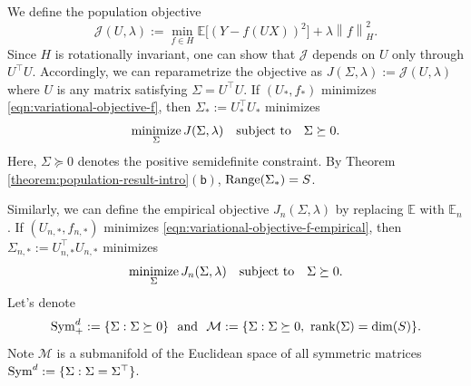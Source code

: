 \documentclass[sn-mathphys-num]{sn-jnl}%
\numberwithin{equation}{section}
\newcommand{\R}{\mathbb{R}}
\newcommand{\E}{\mathbb{E}}
\newcommand{\norm}[1]{\left\|{#1}\right\|} %
\providecommand{\minimize}{\mathop{\rm minimize}}
\newcommand{\matrixnorm}[1]{\left|\!\left|\!\left|{#1}
  \right|\!\right|\!\right|} %
\newcommand{\Range}{{\rm Range}}
\newcommand{\rank}{{\rm rank}}
\newcommand{\Sym}{{\rm \mathrm{Sym}}}
\providecommand{\minimize}{\mathop{\rm minimize}}
\theoremstyle{thmstyleone}%
\theoremstyle{thmstyletwo}%
\theoremstyle{thmstylethree}%
\begin{document}
We define the population objective 
\begin{equation}
\label{eqn:definition-of-J}
	\mathcal{J}(U, \lambda) := \min_{f \in H}
		\E \big[(Y - f(UX))^2\big] + \lambda \norm{f}_{H}^2 .
\end{equation}
Since $H$ is rotationally invariant, one can show that $\mathcal{J}$ depends on $U$ only through $U^\top U$.
Accordingly, we can reparametrize the objective as
$J(\Sigma,\lambda) := \mathcal{J}(U,\lambda)$
where $U$ is any matrix satisfying $\Sigma = U^\top U$. 
If $(U_{*}, f_{*})$ minimizes \eqref{eqn:variational-objective-f}, then
$\Sigma_{*} := U_{*}^\top U_{*}$ minimizes
\begin{equation}
	\minimize_\Sigma J(\Sigma, \lambda)~~~\text{subject to}~~~\Sigma \succeq 0. 
\end{equation}
Here, $\Sigma \succeq 0$ denotes the positive semidefinite constraint. By Theorem
\ref{theorem:population-result-intro}$\mathsf{(b)}$, $\Range(\Sigma_*) = S$.

Similarly, we can define the empirical objective $J_n(\Sigma,\lambda)$ by replacing $\E$ with $\E_n$.
If $(U_{n, *}, f_{n, *})$ minimizes \eqref{eqn:variational-objective-f-empirical}, then
$\Sigma_{n, *} := U_{n, *}^\top U_{n, *}$ minimizes
\begin{equation}
	\minimize_\Sigma J_n(\Sigma, \lambda)~~~\text{subject to}~~~\Sigma \succeq 0.
\end{equation} 
Let's denote 
\begin{equation}
\label{eqn:definition-of-sym-+-d-M}
	\Sym_+^d := \{\Sigma: \Sigma \succeq 0\}
	~~\text{and}~~
	\mathcal{M} := \{\Sigma: \Sigma \succeq 0,~\rank(\Sigma) = \dim(S)\}.
\end{equation} 
Note $\mathcal{M}$ is a submanifold of the Euclidean space of all symmetric matrices $\Sym^d:=\{\Sigma: \Sigma = \Sigma^\top\}$.
\vspace{.5em}
\end{document}
